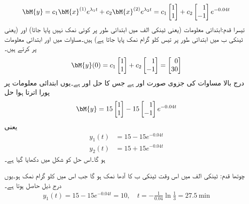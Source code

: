 \begin{align}\label{مساوات_نظام_ٹینکی_پ}
\bM{y}=c_1\bM{x}^{(1)}e^{\lambda_1 t}+c_2\bM{x}^{(2)}e^{\lambda_2 t}=c_1\begin{bmatrix*}[r] 1 \\ 1 \end{bmatrix*}+c_2 \begin{bmatrix*}[r] 1 \\ -1 \end{bmatrix*} e^{-0.04 t}
\end{align}
تیسرا قدم:\quad  ابتدائی معلومات  (یعنی  ٹینکی الف میں ابتدائی طور پر کوئی نمک نہیں پایا جاتا)  اور  (یعنی ٹینکی ب میں ابتدائی طور پر تیس کلو گرام نمک پایا جاتا ہے) ہیں۔مساوات  میں  اور ابتدائی معلومات پر کرتے ہیں۔
\begin{align*}
\bM{y}(0)=c_1\begin{bmatrix*}[r] 1 \\ 1 \end{bmatrix*}+c_2 \begin{bmatrix*}[r] 1 \\ -1 \end{bmatrix*}=\begin{bmatrix*}[r] 0 \\ 30 \end{bmatrix*}
\end{align*}
درج بالا مساوات کی جزوی صورت  اور  ہے جس کا حل  اور  ہے۔یوں ابتدائی معلومات پر پورا اترتا ہوا حل
\begin{align*}
\bM{y}=15\begin{bmatrix*}[r] 1 \\ 1 \end{bmatrix*}-15 \begin{bmatrix*}[r] 1 \\ -1 \end{bmatrix*} e^{-0.04 t}
\end{align*}
یعنی
\begin{align*}
y_1(t)&=15-15e^{-0.04 t}\\
y_2(t)&=15+15e^{-0.04 t}
\end{align*}
ہو گا۔اس حل کو شکل  میں دکھایا گیا ہے۔

چوتھا قدم: ٹینکی الف میں اس وقت ٹینکی ب کا آدھا نمک ہو گا جب اس میں  کلو گرام نمک ہو۔یوں درج ذیل حاصل ہوتا ہے۔
\begin{align*}
y_1(t)=15-15e^{-0.04 t}=10,\quad t=-\frac{1}{0.04}\ln \frac{1}{3}=\SI{27.5}{\minute}
\end{align*}

